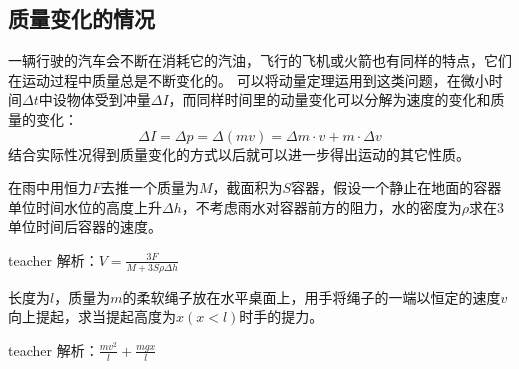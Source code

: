 \subsection{质量变化的情况}
一辆行驶的汽车会不断在消耗它的汽油，飞行的飞机或火箭也有同样的特点，它们在运动过程中质量总是不断变化的。
可以将动量定理运用到这类问题，在微小时间$\Delta t$中设物体受到冲量$\Delta I$，而同样时间里的动量变化可以分解为速度的变化和质量的变化：
\begin{equation}
\Delta I = \Delta p = \Delta (mv) = \Delta m\cdot v+m\cdot \Delta v
\end{equation}
结合实际性况得到质量变化的方式以后就可以进一步得出运动的其它性质。

\begin{example}
在雨中用恒力$F$去推一个质量为$M$，截面积为$S$容器，假设一个静止在地面的容器单位时间水位的高度上升$\Delta h$，不考虑雨水对容器前方的阻力，水的密度为$\rho$求在3单位时间后容器的速度。
\begin{taggedblock}{teacher}
\newline
解析：$V=\frac{3F}{M+3S\rho\Delta h}$
\end{taggedblock}
\end{example}



\begin{example}

长度为$l$，质量为$m$的柔软绳子放在水平桌面上，用手将绳子的一端以恒定的速度$v$向上提起，求当提起高度为$x(x<l)$时手的提力。
\begin{taggedblock}{teacher}
\newline
解析：$\frac{mv^2}{l}+\frac{mgx}{l}$
\end{taggedblock}
\end{example}

